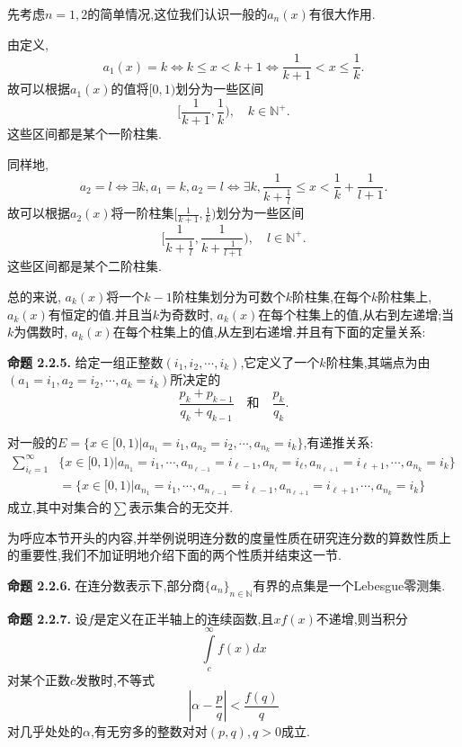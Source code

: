 先考虑$n=1,2$的简单情况,这位我们认识一般的$a_n(x)$有很大作用.\par
由定义,
$$a_1(x)=k\iff k\leqslant x<k+1\iff \frac{1}{k+1}<x\leqslant\frac{1}{k}.$$
故可以根据$a_1(x)$的值将$[0,1)$划分为一些区间
$$[\frac{1}{k+1},\frac{1}{k}),\quad k\in \mathbb{N^{+}}.$$
这些区间都是某个一阶柱集.\par
同样地,
$$a_2=l\iff\exists k,a_1=k,a_2=l\iff\exists k,\dfrac{1}{k+\frac{1}{l}}\leqslant x<\dfrac{1}{k}+\frac{1}{l+1}.$$
故可以根据$a_2(x)$将一阶柱集$[\frac{1}{k+1},\frac{1}{k})$划分为一些区间
$$[\dfrac{1}{k+\frac{1}{l}},\dfrac{1}{k+\frac{1}{l+1}}),\quad l\in \mathbb{N^{+}}.$$
这些区间都是某个二阶柱集.\par
总的来说, $a_{k}(x)$将一个$k-1$阶柱集划分为可数个$k$阶柱集,在每个$k$阶柱集上, $a_{k}(x)$有恒定的值.并且当$k$为奇数时, $a_k(x)$在每个柱集上的值,从右到左递增;当$k$为偶数时, $a_k(x)$在每个柱集上的值,从左到右递增.并且有下面的定量关系:\par
\textbf{命题 2.2.5.  }\textsuperscript{\cite{Khinchin}}
给定一组正整数$(i_1,i_2,\cdots,i_k)$,它定义了一个$k$阶柱集,其端点为由$(a_1=i_1,a_2=i_2,\cdots,a_k=i_k)$所决定的
$$\frac{p_k+p_{k-1}}{q_k+q_{k-1}}\quad\text{和}\quad\frac{p_k}{q_k}.$$
\par
对一般的$E=\{x\in [0,1)|a_{n_1}=i_1,a_{n_2}=i_2,\cdots,a_{n_k}=i_k\}$,有递推关系:
\begin{align*}
    \sum_{i_{\ell}=1}^{\infty} & \{x\in [0,1)|a_{n_1}=i_1,\cdots,a_{n_{\ell-1}}=i_{\ell-1},a_{n_{\ell}}=i_{\ell},a_{n_{\ell+1}}=i_{\ell+1},\cdots,a_{n_k}=i_k\} \\
                               & =\{x\in [0,1)|a_{n_1}=i_1,\cdots,a_{n_{\ell-1}}=i_{\ell-1},a_{n_{\ell+1}}=i_{\ell+1},\cdots,a_{n_k}=i_k\}
\end{align*}
成立,其中对集合的$\sum$表示集合的无交并.\par
为呼应本节开头的内容,并举例说明连分数的度量性质在研究连分数的算数性质上的重要性,我们不加证明地介绍下面的两个性质并结束这一节.\par
\textbf{命题 2.2.6.  }\textsuperscript{\cite{Khinchin}}
在连分数表示下,部分商$\{a_n\}_{n\in \mathbb{N}}$有界的点集是一个Lebesgue零测集.
\par
\par
\textbf{命题 2.2.7.  }\textsuperscript{\cite{Khinchin}}
设$f$是定义在正半轴上的连续函数,且$xf(x)$不递增,则当积分
$$
    \int\limits_{c}^{\infty}f\left(x\right)dx
$$
对某个正数$c$发散时,不等式
$$\left|\alpha-\frac{p}{q}\right|<\frac{f(q)}{q}$$
对几乎处处的$\alpha$,有无穷多的整数对对$(p,q),q>0$成立.
\par

